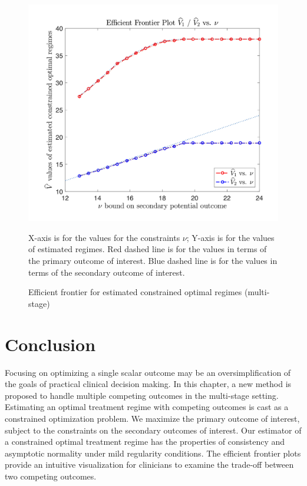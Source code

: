 \begin{figure}[H]
	\centering
\includegraphics[width=0.9\linewidth]{./Chapter-2/figs/efficient_plot.png}
\caption{Efficient frontier for estimated constrained optimal regimes (multi-stage)}
\justify
X-axis is for the values for the constraints $\nu$; Y-axis is for the values of estimated regimes. Red dashed line is for the values in terms of the primary outcome of interest. Blue dashed line is for the values in terms of the secondary outcome of interest.
\end{figure}


\section{Conclusion}
Focusing on optimizing a single scalar outcome may be an oversimplification of the goals of practical clinical decision making. In this chapter, a new method is proposed to handle multiple competing outcomes in the multi-stage setting. Estimating an optimal treatment regime with competing outcomes is cast as a constrained optimization problem. We maximize the primary outcome of interest, subject to the constraints on the secondary outcomes of interest. Our estimator of a constrained optimal treatment regime has the properties of consistency and asymptotic normality under mild regularity conditions. The efficient frontier plots provide an intuitive visualization for clinicians to examine the trade-off between two competing outcomes. 
